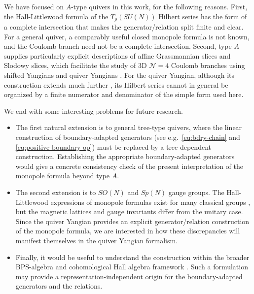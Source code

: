 \documentclass[12pt,a4paper]{article}
\begin{document}
We have focused on $A$-type quivers in this work, for the following reasons. First, the Hall-Littlewood formula of the $T_\rho(SU(N))$ Hilbert series  has the  form of a complete intersection \cite{CremonesiEtAl2014} that makes the generator/relation split finite and clear.  For a general quiver, a comparably useful closed monopole formula is not known, and the Coulomb branch need not be a complete intersection. Second, type $A$ supplies particularly explicit descriptions \cite{MirkovicVybornov2002,MV2002,maffei2000,KWWY2012} of affine Grassmannian slices and Slodowy slices, which facilitate the study of 3D $\mathcal N=4$ Coulomb branches using shifted Yangians \cite{BullimoreDimofteGaiotto2017,BFN2019} and quiver Yangians \cite{ChenLi2026}. For the quiver Yangian, although its construction extends much further \cite{LiYamazaki2020,Bao2022,Bao2023,Li2024,GalakhovEtAl2024}, its Hilbert series cannot in general be organized by a finite numerator and denominator of the simple form used here.

\medskip

We end with some interesting problems for future research.
\begin{itemize}
    \item The first natural extension is to general tree-type quivers, where the linear construction of boundary-adapted generators (see e.g.\  \eqref{eq:bdry-chain} and \eqref{eq:positive-boundary-op}) must be replaced by a tree-dependent construction. Establishing the appropriate boundary-adapted generators would give a concrete consistency check of the present interpretation of the monopole formula beyond type $A$.
    \item The second extension is to $SO(N)$ and $Sp(N)$ gauge groups. The Hall-Littlewood expressions of monopole formulas exist for many classical groups \cite{CremonesiEtAl2014}, but the magnetic lattices and gauge invariants differ from the unitary case. Since the quiver Yangian provides an explicit generator/relation construction of the monopole formula, we are interested in how these discrepancies will manifest themselves in the quiver Yangian formalism.
    \item Finally, it would be useful to understand the construction within the broader BPS-algebra and cohomological Hall algebra framework \cite{KontsevichSoibelman2011}.  Such a formulation may provide a representation-independent origin for the boundary-adapted generators and the relations. 
\end{itemize}
\end{document}

